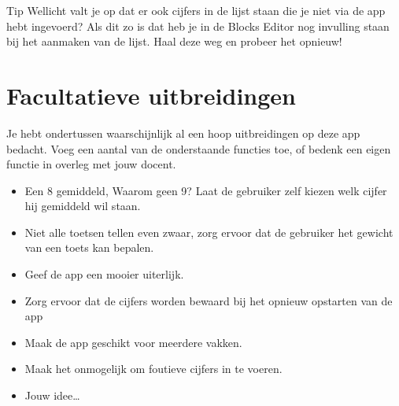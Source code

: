 \begin{derivation}{Tip}
Wellicht valt je op dat er ook cijfers in de lijst staan die je niet via de app hebt ingevoerd? Als dit zo is dat heb je in de Blocks Editor nog invulling staan bij het aanmaken van de lijst. Haal deze weg en probeer het opnieuw!
\end{derivation}

\section{Facultatieve uitbreidingen}
Je hebt ondertussen waarschijnlijk al een hoop uitbreidingen op deze app bedacht. Voeg een aantal van de onderstaande functies toe, of bedenk een eigen functie in overleg met jouw docent.

\begin{itemize}
  \item Een 8 gemiddeld, Waarom geen 9? Laat de gebruiker zelf kiezen welk cijfer hij gemiddeld wil staan.
  \item Niet alle toetsen tellen even zwaar, zorg ervoor dat de gebruiker het gewicht van een toets kan bepalen.
  \item Geef de app een mooier uiterlijk.
  \item Zorg ervoor dat de cijfers worden bewaard bij het opnieuw opstarten van de app
  \item Maak de app geschikt voor meerdere vakken.
  \item Maak het onmogelijk om foutieve cijfers in te voeren.
  \item Jouw idee\dots
\end{itemize}

